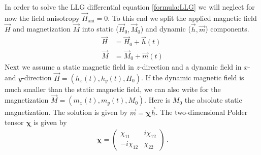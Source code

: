 In order to solve the LLG differential equation \ref{formula:LLG} we will neglect for now the field anisotropy $\vec{H}_\text{ani}=0$. To this end we split the applied magnetic field $\vec{H}$ and magnetization $\vec{M}$ into static ($\vec{H}_0, \vec{M}_0$) and dynamic ($\vec{h}, \vec{m}$) components.
\begin{align}
    \vec{H}&=\vec{H}_0+\vec{h}(t)\label{formula:LLG_field}\\
    \vec{M}&=\vec{M}_0+\vec{m}(t)
\end{align}
Next we assume a static magnetic field in $z$-direction and a dynamic field in $x$- and $y$-direction $\vec{H}=\left(h_x(t),h_y(t),H_0\right)$. If the dynamic magnetic field is much smaller than the static magnetic field, we can also write for the magnetization $\vec{M}=\left(m_x(t),m_y(t),M_0\right)$. Here is $M_0$ the absolute static magnetization. The solution is given by $\vec{m}=\boldsymbol{\chi}\vec{h}$. The two-dimensional Polder tensor $\boldsymbol{\chi}$ is given by
\begin{align}
    \boldsymbol{\chi}=
    \left(
    \begin{array}{cc}
        \chi_{11} & i\chi_{12} \\
        -i\chi_{12} & \chi_{22}
    \end{array}
    \right)\,.
\end{align}
\cite{gurevich1996magnetization}

